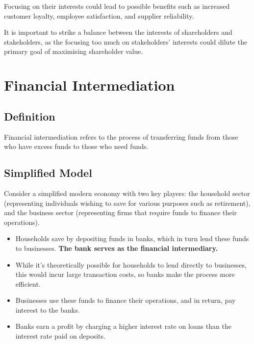 Focusing on their interests could lead to possible benefits such as increased customer loyalty, employee satisfaction, and supplier reliability.

It is important to strike a balance between the interests of shareholders and stakeholders, as the focusing too much on stakeholders' interests could dilute the primary goal of maximising shareholder value.


\section{Financial Intermediation}

\subsection*{Definition}
Financial intermediation refers to the process of transferring funds from those who have excess funds to those who need funds.

\subsection*{Simplified Model}
Consider a simplified modern economy with two key players: the household sector (representing individuals wishing to save for various purposes such as retirement), and the business sector (representing firms that require funds to finance their operations).

\begin{itemize}
    \item Households save by depositing funds in banks, which in turn lend these funds to businesses. \textbf{The bank serves as the financial intermediary.}
    \item While it's theoretically possible for households to lend directly to businesses, this would incur large transaction costs, so banks make the process more efficient.
    \item Businesses use these funds to finance their operations, and in return, pay interest to the banks. 
    \item Banks earn a profit by charging a higher interest rate on loans than the interest rate paid on deposits.
\end{itemize}

